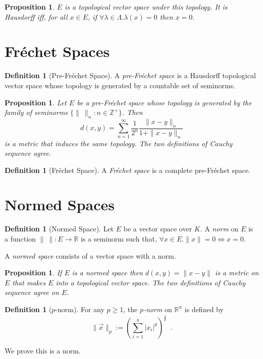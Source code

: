 \documentclass{book}
\newtheorem{prop}[ax]{Proposition}
\theoremstyle{definition}
\newtheorem{df}[ax]{Definition}
\begin{document}
\begin{prop}
$E$ is a topological vector space under this topology. It is Hausdorff iff, for all $x \in E$, if $\forall \lambda \in \Lambda. \lambda(x) = 0$ then $x = 0$.
\end{prop}

\section{Fr\'{e}chet Spaces}

\begin{df}[Pre-Fr\'{e}chet Space]
A \emph{pre-Fr\'{e}chet space} is a Hausdorff topological vector space whose topology is generated by a countable set of seminorms.
\end{df}

\begin{prop}
Let $E$ be a pre-Fr\'{e}chet space whose topology is generated by the family of seminorms $\{ \|\ \|_n : n \in \mathbb{Z}^+ \}$. Then
\[ d(x,y) = \sum_{n=1}^\infty \frac{1}{2^n} \frac{\|x-y\|_n}{1 + \|x-y\|_n} \]
is a metric that induces the same topology. The two definitions of Cauchy sequence agree.
\end{prop}

\begin{df}[Fr\'{e}chet Space]
A \emph{Fr\'{e}chet space} is a complete pre-Fr\'{e}chet space.
\end{df}

\section{Normed Spaces}

\begin{df}[Normed Space]
Let $E$ be a vector space over $K$. A \emph{norm} on $E$ is a function $\|\ \| : E \rightarrow \mathbb{R}$ is a seminorm such that, $\forall x \in E. \| x \| = 0 \Leftrightarrow x = 0$.

A \emph{normed space} consists of a vector space with a norm.
\end{df}

\begin{prop}
If $E$ is a normed space then $d(x,y) = \| x - y \|$ is a metric on $E$ that makes $E$ into a topological vector space. The two definitions of Cauchy sequence agree on $E$.
\end{prop}

\begin{df}[$p$-norm]
For any $p \geq 1$, the \emph{$p$-norm} on $\mathbb{R}^n$ is defined by
\[ \| \vec{x} \|_p := \left( \sum_{i=1}^n |x_i|^p \right)^{\frac{1}{p}} \enspace . \]

We prove this is a norm.
\end{df}
\end{document}
